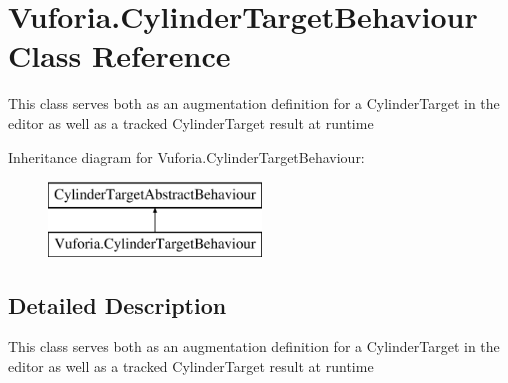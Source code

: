 \hypertarget{class_vuforia_1_1_cylinder_target_behaviour}{}\section{Vuforia.\+Cylinder\+Target\+Behaviour Class Reference}
\label{class_vuforia_1_1_cylinder_target_behaviour}


This class serves both as an augmentation definition for a Cylinder\+Target in the editor as well as a tracked Cylinder\+Target result at runtime  


Inheritance diagram for Vuforia.\+Cylinder\+Target\+Behaviour\+:\begin{figure}[H]
\begin{center}
\leavevmode
\includegraphics[height=2.000000cm]{class_vuforia_1_1_cylinder_target_behaviour}
\end{center}
\end{figure}


\subsection{Detailed Description}
This class serves both as an augmentation definition for a Cylinder\+Target in the editor as well as a tracked Cylinder\+Target result at runtime 

